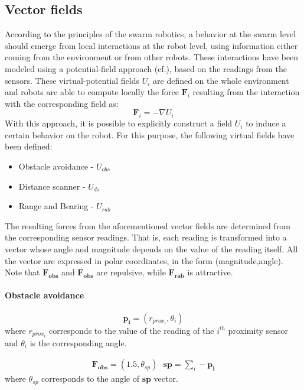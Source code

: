 \subsection{Vector fields}
According to the principles of the swarm robotics, a behavior at the swarm level should emerge from local interactions at the robot level, using information either coming from the environment or from other robots.
These interactions have been modeled using a potential-field approach (cf.\cite{howard2002mobile}), based on the readings from the sensors.
These virtual-potential fields $U_i$ are defined on the whole environment and robots are able to compute locally the force $\mathbf{F}_i$ resulting from the interaction with the corresponding field as:
\begin{equation}
  \mathbf{F}_i = -\nabla U_i
\end{equation}
With this approach, it is possible to explicitly construct a field $U_i$ to induce a certain behavior on the robot.
For this purpose, the following virtual fields have been defined:
\begin{itemize}
  \item Obstacle avoidance - $U_{obs}$
  \item Distance scanner - $U_{ds}$
  \item Range and Bearing - $U_{rab}$
\end{itemize} 

The resulting forces from the aforementioned vector fields are determined from the corresponding sensor readings.
That is, each reading is transformed into a vector whose angle and magnitude depends on the value of the reading itself.
All the vector are expressed in polar coordinates, in the form (magnitude,angle).
Note that $\mathbf{F_{obs}}$ and $\mathbf{F_{obs}}$ are repulsive, while $\mathbf{F_{rab}}$ 
is attractive.

\paragraph{Obstacle avoidance}
\begin{equation}
\mathbf{p_i} = (r_{prox_{i}},\theta_i)  
\end{equation}
where $r_{prox_i}$ corresponds to the value of the reading of the $i^{th}$ proximity sensor and $\theta_i$ is the corresponding angle.

\begin{align}
 \mathbf{F_{obs}} = (1.5,\theta_{sp}) \text{    } \mathbf{sp} = \sum_i -\mathbf{p_i}  
\end{align}
where $\theta_{sp}$ corresponds to the angle of $\mathbf{sp}$ vector.

